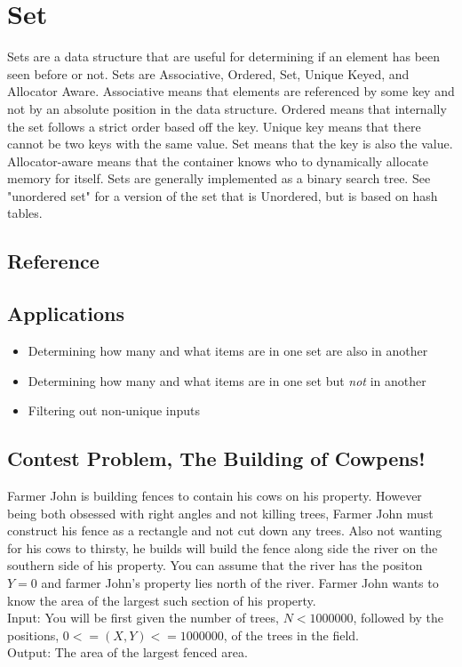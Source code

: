 \section{Set}
Sets are a data structure that are useful for determining if an element has been seen before or not.  Sets are Associative, Ordered, Set, Unique Keyed, and Allocator Aware\cite{cplusplus}.  Associative means that elements are referenced by some key and not by an absolute position in the data structure. Ordered means that internally the set follows a strict order based off the key.  Unique key means that there cannot be two keys with the same value.  Set means that the key is also the value. Allocator-aware means that the container knows who to dynamically allocate memory for itself.  Sets are generally implemented as a binary search tree.  See "unordered set" for a version of the set that is Unordered, but is based on hash tables.

\subsection{Reference}


\subsection{Applications}
\begin{itemize}
    \item   Determining how many and what items are in one set are also in another
    \item   Determining how many and what items are in one set but \emph{not} in another
    \item   Filtering out non-unique inputs
\end{itemize}

\subsection{Contest Problem, The Building of Cowpens!}
Farmer John is building fences to contain his cows on his property.  However being both obsessed with right angles and not killing trees, Farmer John must construct his fence as a rectangle and not cut down any trees.  Also not wanting for his cows to thirsty, he builds will build the fence along side the river on the southern side of his property.  You can assume that the river has the positon $Y=0$ and farmer John's property lies north of the river.  Farmer John wants to know the area of the largest such section of his property.\\
Input: You will be first given the number of trees, $N<1000000$, followed by the positions, $0<=(X,Y) <= 1000000$, of the trees in the field. \\
Output: The area of the largest fenced area.

